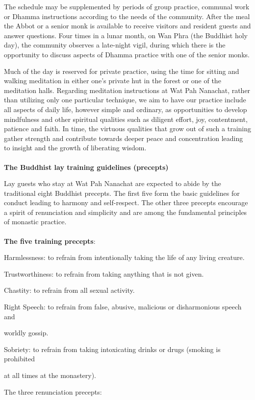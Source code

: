 The schedule may be supplemented by periods of group practice,
communal work or Dhamma instructions according to the needs of the
community. After the meal the Abbot or a senior monk is available to
receive visitors and resident guests and answer questions. Four times in
a lunar month, on Wan Phra (the Buddhist holy day), the community
observes a late-night vigil, during which there is the opportunity to
discuss aspects of Dhamma practice with one of the senior monks.

Much of the day is reserved for private practice, using the time for
sitting and walking meditation in either one's private hut in the forest
or one of the meditation halls. Regarding meditation instructions at Wat
Pah Nanachat, rather than utilizing only one particular technique, we
aim to have our practice include all aspects of daily life, however
simple and ordinary, as opportunities to develop mindfulness and other
spiritual qualities such as diligent effort, joy, contentment, patience
and faith. In time, the virtuous qualities that grow out of such a
training gather strength and contribute towards deeper peace and
concentration leading to insight and the growth of liberating
wisdom.\\\\\textbf{The Buddhist lay training guidelines (precepts)}

Lay guests who stay at Wat Pah Nanachat are expected to abide by the
traditional eight Buddhist precepts. The first five form the basic
guidelines for conduct leading to harmony and self-respect. The other
three precepts encourage a spirit of renunciation and simplicity and are
among the fundamental principles of monastic practice.\\\\\textbf{The
five training precepts}:

Harmlessness: to refrain from intentionally taking the life of any
living creature.

Trustworthiness: to refrain from taking anything that is not given.

Chastity: to refrain from all sexual activity.

Right Speech: to refrain from false, abusive, malicious or disharmonious
speech and

worldly gossip.

Sobriety: to refrain from taking intoxicating drinks or drugs (smoking
is prohibited

at all times at the monastery).

The three renunciation precepts:

